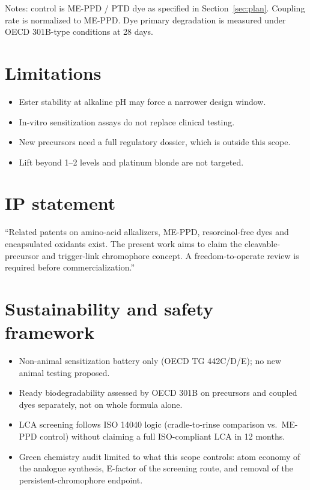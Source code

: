 \documentclass[11pt,a4paper]{article}
\begin{document}
Notes: control is ME-PPD / PTD dye as specified in Section~\ref{sec:plan}. Coupling rate is normalized to ME-PPD. Dye primary degradation is measured under OECD 301B-type conditions at 28 days.

\section{Limitations}

\begin{itemize}[leftmargin=1.5em]
\item Ester stability at alkaline pH may force a narrower design window.
\item In-vitro sensitization assays do not replace clinical testing.
\item New precursors need a full regulatory dossier, which is outside this scope.
\item Lift beyond 1--2 levels and platinum blonde are not targeted.
\end{itemize}

\section{IP statement}

``Related patents on amino-acid alkalizers, ME-PPD, resorcinol-free dyes and encapsulated oxidants exist. The present work aims to claim the cleavable-precursor and trigger-link chromophore concept. A freedom-to-operate review is required before commercialization.''

\section{Sustainability and safety framework}

\begin{itemize}[leftmargin=1.5em]
\item Non-animal sensitization battery only (OECD TG 442C/D/E); no new animal testing proposed.
\item Ready biodegradability assessed by OECD 301B on precursors and coupled dyes separately, not on whole formula alone.
\item LCA screening follows ISO 14040 logic (cradle-to-rinse comparison vs.\ ME-PPD control) without claiming a full ISO-compliant LCA in 12 months.
\item Green chemistry audit limited to what this scope controls: atom economy of the analogue synthesis, E-factor of the screening route, and removal of the persistent-chromophore endpoint.
\end{itemize}
\end{document}

